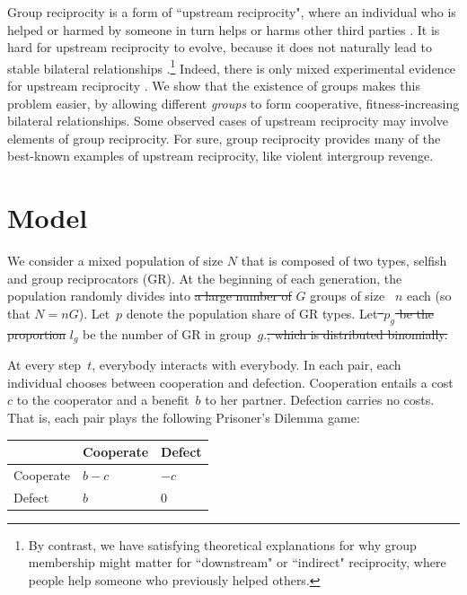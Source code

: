 \documentclass[12pt,a4paper]{article}
\newcommand{\mm}[1]{{\color{red} #1}}
\begin{document}
Group reciprocity is a form of ``upstream reciprocity", where an individual who is helped or harmed by someone in turn helps or harms other third parties \parencite{boyd1989evolution}. It is hard for upstream reciprocity to evolve, because it does not naturally lead to stable bilateral relationships \parencite{nowak2007upstream}.\footnote{By contrast, we have satisfying theoretical explanations for why group membership might matter for ``downstream" or ``indirect" reciprocity, where people help someone who previously helped others.} Indeed, there is only mixed experimental evidence for upstream reciprocity \parencite{ben2004reciprocity,stanca2009measuring,van2016indirect,horita2016transient,greiner2005indirect}. We show that the existence of groups makes this problem easier, by allowing different \emph{groups} to form cooperative, fitness-increasing bilateral relationships. Some observed cases of upstream reciprocity \parencite[e.g.][]{mujcic2018indirect,yuan2019gift} may involve elements of group reciprocity. For sure, group reciprocity provides many of the best-known examples of upstream reciprocity, like violent intergroup revenge.


\section{Model}

We consider a mixed population of \mm{size $N$ that is composed of }two types, selfish and group reciprocators (GR). At the beginning of each generation, the population randomly divides into \sout{a large number of} \mm{$G$} groups of size~\mm{$n$} each \mm{(so that $N=nG$)}.
Let~$p$ denote the population share of GR types. 
Let\sout{~$p_g$ be the proportion} \mm{$l_g$ be the number} of GR in group~$g$.\sout{, which is distributed binomially.}

At every step~$t$, everybody interacts with everybody. In each pair, each individual chooses between cooperation and defection. Cooperation entails a cost~$c$ to the cooperator and a benefit~$b$ to her partner. Defection carries no costs. That is, each pair plays the following Prisoner's Dilemma game:
\begin{center}
    \begin{tabularx}{0.5\textwidth}{|x|x|x|}
        \hline
        &   Cooperate   &   Defect  \\
        \hline
        Cooperate   &   $b-c$   &   $-c$    \\
        \hline
        Defect  &   $b$ &   $0$   \\
        \hline
    \end{tabularx}
\end{center}
\end{document}
